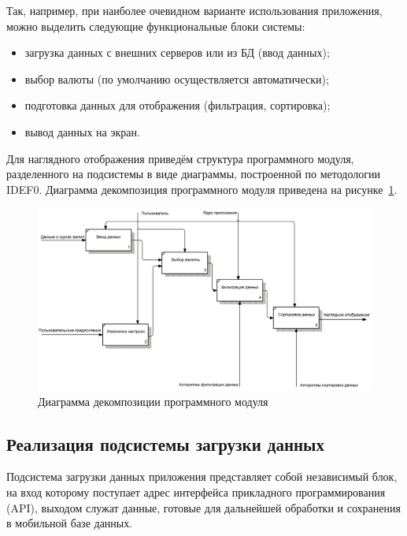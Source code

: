 Так, например, при наиболее очевидном варианте использования приложения,
можно выделить следующие функциональные блоки системы:
\begin{itemize}
  \item загрузка данных с внешних серверов или из БД (ввод данных);
  \item выбор валюты (по умолчанию осуществляется автоматически);
  \item подготовка данных для отображения (фильтрация, сортировка);
  \item вывод данных на экран.
\end{itemize}

Для наглядного отображения приведём структура программного модуля,
разделенного на подсистемы в виде диаграммы, построенной по методологии IDEF0.
Диаграмма декомпозиция программного модуля приведена
на рисунке~\ref{fig:idef0_structure}.
\begin{figure}[h!]
  \centering
  \includegraphics[width=165mm]{fig/IDEF0_structure}
  \caption{Диаграмма декомпозиции программного модуля}
  \label{fig:idef0_structure}
\end{figure}

\newpage



\subsection{Реализация подсистемы загрузки данных}
\label{subs:realization_network_requests}

Подсистема загрузки данных приложения представляет собой независимый блок,
на вход которому поступает адрес интерфейса прикладного программирования (API),
выходом служат данные, готовые для дальнейшей обработки и сохранения
в мобильной базе данных.


